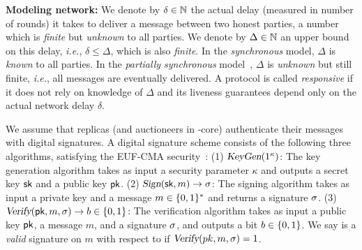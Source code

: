 \textbf{Modeling network:}
We denote by $\delta \in \mathbb{N}$ the actual delay (measured in number of rounds) it takes to deliver a message between two honest parties,
a number which is \emph{finite} but \emph{unknown} to all parties.
We denote by $\Delta \in \mathbb{N}$ an upper bound on this delay, \textit{i.e.}, $\delta \leq \Delta$, which is also \emph{finite}.
In the \emph{synchronous} model, $\Delta$ is \emph{known} to all parties.
In the \emph{partially synchronous} model~\cite{psync}, $\Delta$ is \emph{unknown} but still finite, \textit{i.e.}, all messages are eventually delivered.
A protocol is called \emph{responsive} if it does not rely on knowledge of $\Delta$ and its liveness guarantees depend only on the actual network delay $\delta$.

 We assume that replicas (and auctioneers in \bidsettm-core) authenticate their messages with digital signatures. A digital signature scheme consists of the following three algorithms, satisfying the EUF-CMA security~\cite{GMR88}:
(1) $\textsl{KeyGen}(1^{\kappa})$:
The key generation algorithm takes as input a security parameter $\kappa$ and outputs a secret key $\textsf{sk}$ and a public key $\textsf{pk}$.
(2) $\textsl{Sign}(\textsf{sk}, m) \rightarrow \sigma$:
The signing algorithm takes as input a private key
\sk and a message $m \in \{ 0, 1\}^*$ and returns a signature $\sigma$.
(3)$\textsl{Verify}(\textsf{pk}, m, \sigma) \rightarrow b \in \{ 0, 1\}$:
The verification algorithm takes as input a public
key $\textsf{pk}$, a message $m$, and a signature $\sigma$, and outputs a bit $b\in \{ 0, 1\}$.
We say \sig is a \emph{valid} signature on $m$ with respect to \pk if $\textsl{Verify}(pk, m, \sigma) = 1$.



